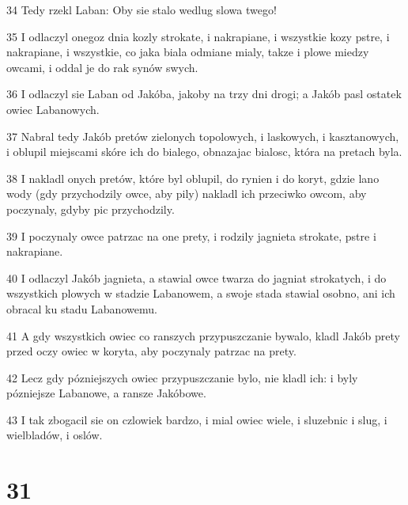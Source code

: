 \par 34 Tedy rzekl Laban: Oby sie stalo wedlug slowa twego!
\par 35 I odlaczyl onegoz dnia kozly strokate, i nakrapiane, i wszystkie kozy pstre, i nakrapiane, i wszystkie, co jaka biala odmiane mialy, takze i plowe miedzy owcami, i oddal je do rak synów swych.
\par 36 I odlaczyl sie Laban od Jakóba, jakoby na trzy dni drogi; a Jakób pasl ostatek owiec Labanowych.
\par 37 Nabral tedy Jakób pretów zielonych topolowych, i laskowych, i kasztanowych, i oblupil miejscami skóre ich do bialego, obnazajac bialosc, która na pretach byla.
\par 38 I nakladl onych pretów, które byl oblupil, do rynien i do koryt, gdzie lano wody (gdy przychodzily owce, aby pily) nakladl ich przeciwko owcom, aby poczynaly, gdyby pic przychodzily.
\par 39 I poczynaly owce patrzac na one prety, i rodzily jagnieta strokate, pstre i nakrapiane.
\par 40 I odlaczyl Jakób jagnieta, a stawial owce twarza do jagniat strokatych, i do wszystkich plowych w stadzie Labanowem, a swoje stada stawial osobno, ani ich obracal ku stadu Labanowemu.
\par 41 A gdy wszystkich owiec co ranszych przypuszczanie bywalo, kladl Jakób prety przed oczy owiec w koryta, aby poczynaly patrzac na prety.
\par 42 Lecz gdy pózniejszych owiec przypuszczanie bylo, nie kladl ich: i byly pózniejsze Labanowe, a ransze Jakóbowe.
\par 43 I tak zbogacil sie on czlowiek bardzo, i mial owiec wiele, i sluzebnic i slug, i wielbladów, i oslów.

\chapter{31}

